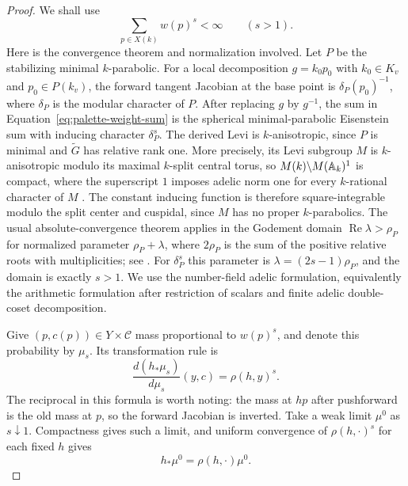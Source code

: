 \begin{proof}
We shall use
\begin{equation}\label{eq:palette-weight-sum}
 \sum_{p\in X(k)}w(p)^s<\infty\qquad(s>1).
\end{equation}
Here is the convergence theorem and normalization involved. Let $P$ be
the stabilizing minimal $k$-parabolic. For a local decomposition
$g=k_0p_0$ with $k_0\in K_v$ and $p_0\in P(k_v)$, the forward tangent
Jacobian at the base point is $\delta_P(p_0)^{-1}$, where $\delta_P$ is
the modular character of $P$. After replacing $g$ by $g^{-1}$, the
sum in Equation~\ref{eq:palette-weight-sum} is the spherical
minimal-parabolic Eisenstein sum with inducing character $\delta_P^s$.
The derived Levi is $k$-anisotropic, since $P$ is minimal and
$\widetilde G$ has relative rank one. More precisely, its Levi subgroup
$M$ is $k$-anisotropic modulo its maximal $k$-split central torus, so
$M(k)\backslash M(\mathbb A_k)^1$ is compact, where the superscript $1$
imposes adelic norm one for every $k$-rational character of $M$
\cite[Theorem~5.6]{PRbook}.
The constant inducing function is therefore square-integrable modulo
the split center and cuspidal, since $M$ has no proper $k$-parabolics.
The usual absolute-convergence
theorem applies in the Godement domain
$\operatorname{Re}\lambda>\rho_P$ for normalized parameter
$\rho_P+\lambda$, where $2\rho_P$ is the sum of the positive relative
roots with multiplicities; see
\cite[Chapter~4, Lemma~4.1, and Appendix~II]{Langlands}.
For $\delta_P^s$ this parameter is
$\lambda=(2s-1)\rho_P$, and the domain is exactly $s>1$.
We use the number-field adelic formulation, equivalently the arithmetic
formulation after restriction of scalars and finite adelic double-coset
decomposition.

Give $(p,c(p))\in Y\times\mathcal C$ mass proportional to $w(p)^s$,
and denote this probability by $\mu_s$. Its transformation rule is
\[
 \frac{d(h_*\mu_s)}{d\mu_s}(y,c)=\rho(h,y)^s.
\]
The reciprocal in this formula is worth noting: the mass at $hp$ after
pushforward is the old mass at $p$, so the forward Jacobian is inverted.
Take a weak limit $\mu^0$ as $s\downarrow1$. Compactness gives such a
limit, and uniform convergence of $\rho(h,\cdot)^s$ for each fixed $h$
gives
\begin{equation}\label{eq:palette-joint-conformal}
 h_*\mu^0=\rho(h,\cdot)\mu^0.
\end{equation}


\end{proof}
